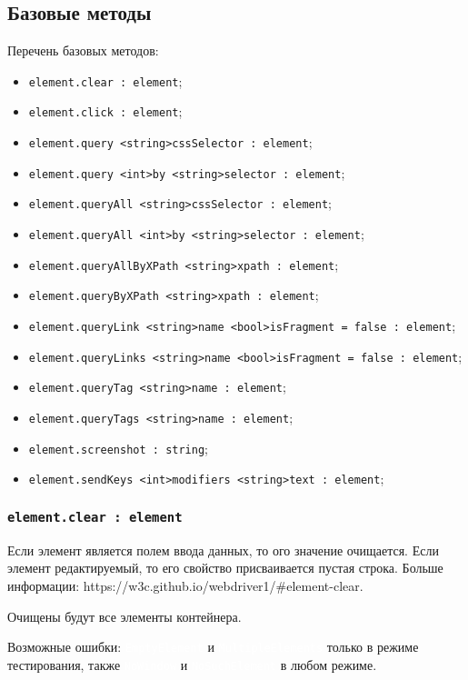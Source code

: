 \documentclass[a4paper, 14pt]{extarticle}
\newcommand{\ferror}[1]{{\fontsize{11pt}{12pt} \tt \colorbox{function}{\textcolor{white}{#1}}}}
\newenvironment{icItems}
	{ \begin{itemize} [noitemsep,nolistsep] }
	{ \end{itemize} }
\begin{document}
\subsection{Базовые методы}

Перечень базовых методов:
\begin{icItems}
	\item \lstinline|element.clear : element|;
	\item \lstinline|element.click : element|;
	\item \lstinline|element.query <string>cssSelector : element|;
	\item \lstinline|element.query <int>by <string>selector : element|;
	\item \lstinline|element.queryAll <string>cssSelector : element|;
	\item \lstinline|element.queryAll <int>by <string>selector : element|;
	\item \lstinline|element.queryAllByXPath <string>xpath : element|;
	\item \lstinline|element.queryByXPath <string>xpath : element|;
	\item \lstinline|element.queryLink <string>name <bool>isFragment = false : element|;
	\item \lstinline|element.queryLinks <string>name <bool>isFragment = false : element|;
	\item \lstinline|element.queryTag <string>name : element|;
	\item \lstinline|element.queryTags <string>name : element|;
	\item \lstinline|element.screenshot : string|;
	\item \lstinline|element.sendKeys <int>modifiers <string>text : element|;
\end{icItems}

\subsubsection{\lstinline|element.clear : element|}

Если элемент является полем ввода данных, то ого значение очищается. Если элемент редактируемый, то его свойство  присваивается пустая строка. Больше информации: https://w3c.github.io/webdriver1/\#element-clear.

\code{[icL]} Очищены будут все элементы контейнера.

Возможные ошибки: \ferror{EmptyElement} и \ferror{MultipleElements} только в режиме тестирования, также \ferror{NoWindow} и \ferror{NoSuchElement} в любом режиме.
\end{document}
